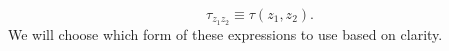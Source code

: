 \begin{equation}
\tau_{z_1z_2} \equiv \tau(z_1,z_2).
\end{equation}
We will choose which form of these expressions to use based on clarity.